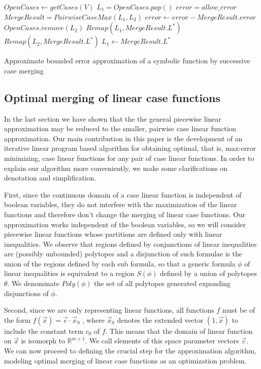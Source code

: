 \begin{algorithm}[!ht]
\dontprintsemicolon
{}
$OpenCases \gets getCases(V)$\;
 {
	$L_1 = OpenCases.pop()$\;
	$error = allow\_error$\;
	  { 
		$MergeResult = PairwiseCaseMax( L_1, L_2)$\;
		{
			$error \gets error - MergeResult.error$\;
			$OpenCases.remove(L_2)$\;
			$ Remap(L_1, MergeResult.L^*) $\;
			$ Remap(L_2, MergeResult.L^*) $\;
			$ L_1 \gets MergeResult.L^* $\;
		}
	}
}
\;
\caption{{\sc Approximate} bounded error approximation of a symbolic function by successive case merging}
\label{alg:approx}
\end{algorithm}

\subsection{ Optimal merging of linear case functions}

In the last section we have shown that the the general piecewise linear approximation may be reduced to the smaller, pairwise case linear function approximation. Our main contribution in this paper is the development of an iterative linear program based algorithm for obtaining optimal, that is, max-error minimizing, case linear functions for any pair of case linear functions. In order to explain our algorithm more conveniently, we make some clarifications on denotation and simplification.

First, since the continuous domain of a case linear function is independent of boolean variables, they do not interfere with the maximization of the linear functions and therefore don't change the merging of linear case functions. Our approximation works independent of the boolean variables, so we will consider piecewise linear functions whose partitions are defined only with linear inequalities. We observe that regions defined by conjunctions of linear inequalities are (possibly unbounded) polytopes and a disjunction of such formulae is the union of the  regions defined by each sub formula, so that a generic formula $\phi$ of linear inequalities is equivalent to a region  $S(\phi)$ defined by a union of polytopes $\theta$. We denominate $Poly(\phi)$ the set of all polytopes generated expanding disjunctions of $\phi$.

Second, since we are only representing linear functions, all functions $f$ must be of the form 
$f(\vec{x}) = \vec{c}\cdot \vec{x}_0$ , where $\vec{x}_0$ denotes the extended vector 
$(1,\vec{x})$ to include the constant term $c_0$ of $f$. This means that the domain of linear function on $\vec{x}$ is isomorph to $\mathbb{R}^{m+1}$. We call elements of this space parameter vectors $\vec{c}$.
We can now proceed to defining the crucial step for the approximation algorithm, modeling optimal merging of linear case functions as an optimization problem.

